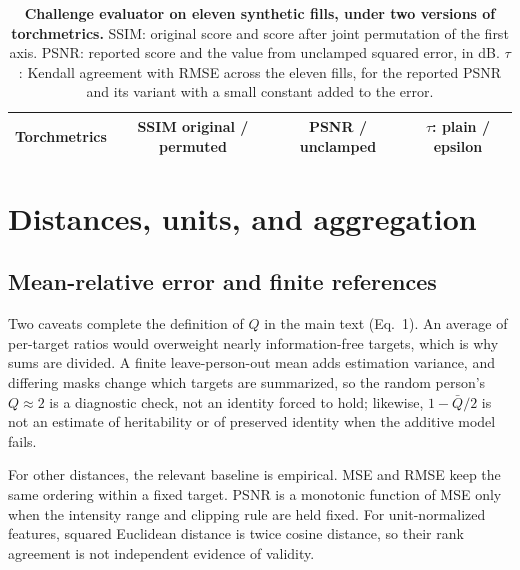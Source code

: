 \begin{table}[htbp]
\centering
\caption{\textbf{Challenge evaluator on eleven synthetic fills, under two versions of torchmetrics.}
SSIM: original score and score after joint permutation of the first axis.
PSNR: reported score and the value from unclamped squared error, in dB.
$\tau$: Kendall agreement with RMSE across the eleven fills, for the reported PSNR and its variant with a small constant added to the error.}
\label{tab:s-brats}
\small
\begin{tabular}{@{}lccc@{}}
\toprule
Torchmetrics & SSIM original / permuted & PSNR / unclamped & $\tau$: plain / epsilon \\
\midrule

\end{tabular}
\end{table}





\section{Distances, units, and aggregation}
\subsection{Mean-relative error and finite references}
Two caveats complete the definition of $Q$ in the main text (Eq.~1).
An average of per-target ratios would overweight nearly information-free targets, which is why sums are divided.
A finite leave-person-out mean adds estimation variance, and differing masks change which targets are summarized, so the random person's $Q\approx2$ is a diagnostic check, not an identity forced to hold; likewise, $1-\bar Q/2$ is not an estimate of heritability or of preserved identity when the additive model fails.

For other distances, the relevant baseline is empirical.
MSE and RMSE keep the same ordering within a fixed target.
PSNR is a monotonic function of MSE only when the intensity range and clipping rule are held fixed.
For unit-normalized features, squared Euclidean distance is twice cosine distance, so their rank agreement is not independent evidence of validity.

